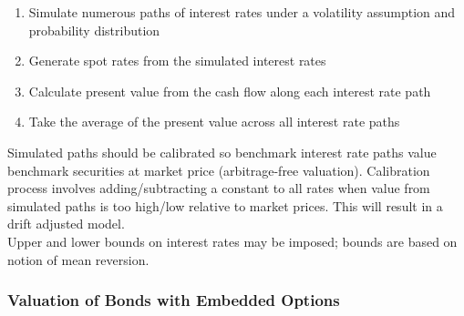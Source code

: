 \begin{method} 
\begin{enumerate}[label=\roman*.]
\setlength{\itemsep}{0pt}
\item Simulate numerous paths of interest rates under a volatility assumption and probability distribution
\item Generate spot rates from the simulated interest rates
\item Calculate present value from the cash flow along each interest rate path
\item Take the average of the present value across all interest rate paths
\end{enumerate}
Simulated paths should be calibrated so benchmark interest rate paths value benchmark securities at market price (arbitrage-free valuation). Calibration process involves adding/subtracting a constant to all rates when value from simulated paths is too high/low relative to market prices. This will result in a drift adjusted model.\\
Upper and lower bounds on interest rates may be imposed; bounds are based on notion of mean reversion.
\end{method}

\subsubsection{Valuation of Bonds with Embedded Options}